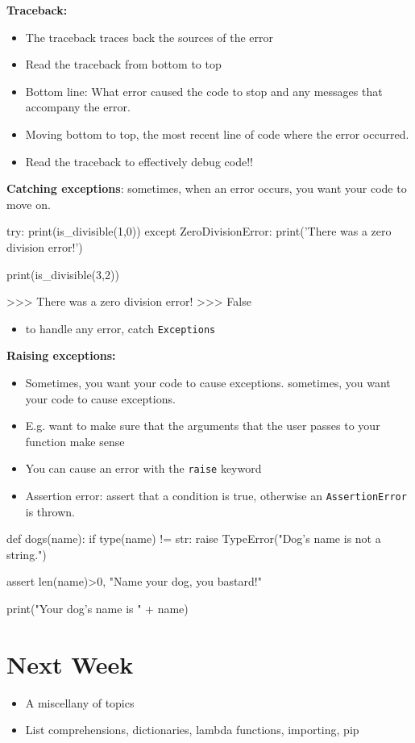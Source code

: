 \documentclass[12pt]{article}
\numberwithin{equation}{section}
\begin{document}
\textbf{Traceback:}
\begin{itemize}
    \item The traceback traces back the sources of the error
    \item Read the traceback from bottom to top
    \item Bottom line: What error caused the code to stop and any messages that accompany the error. 
    \item Moving bottom to top, the most recent line of code where the error occurred.
    \item Read the traceback to effectively debug code!!
\end{itemize}

\textbf{Catching exceptions}: sometimes, when an error occurs, you want your code to move on.
\begin{python}
try:
    print(is_divisible(1,0))
except ZeroDivisionError:
    print('There was a zero division error!')

print(is_divisible(3,2))

>>> There was a zero division error!
>>> False
\end{python}
\begin{itemize}
    \item to handle any error, catch \verb|Exceptions|
\end{itemize}

\textbf{Raising exceptions: }
\begin{itemize}
    \item Sometimes, you want your code to cause exceptions.
sometimes, you want your code to cause exceptions.
    \item E.g. want to make sure that the arguments that the user passes to your function make sense
    \item You can cause an error with the \verb|raise| keyword
    \item Assertion error: assert that a condition is true, otherwise an \verb|AssertionError| is thrown.
\end{itemize}
\begin{python}
def dogs(name):
    if type(name) != str:
        raise TypeError("Dog's name is not a string.")
    
    assert len(name)>0, "Name your dog, you bastard!"
    
    print("Your dog's name is " + name)
\end{python}

\section{Next Week}
\begin{itemize}
    \item A miscellany of topics
    \item List comprehensions, dictionaries, lambda functions, importing, pip
\end{itemize}
\end{document}
